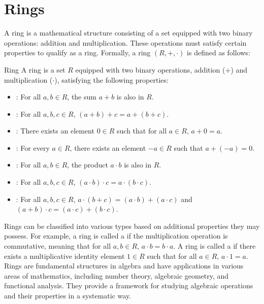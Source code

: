 \documentclass[openany]{book}
\begin{document}
\section{Rings}
A ring is a mathematical structure consisting of a set equipped with two binary operations: addition and multiplication. These operations must satisfy certain properties to qualify as a ring. Formally, a ring $(R, +, \cdot)$ is defined as follows:
\begin{mydefinition}{Ring}
A ring is a set $R$ equipped with two binary operations, addition ($+$) and multiplication ($\cdot$), satisfying the following properties:
\begin{itemize}
    \item {}: For all $a, b \in R$, the sum $a + b$ is also in $R$.
    \item {}: For all $a, b, c \in R$, $(a + b) + c = a + (b + c)$.
    \item {}: There exists an element $0 \in R$ such that for all $a \in R$, $a + 0 = a$.
    \item {}: For every $a \in R$, there exists an element $-a \in R$ such that $a + (-a) = 0$.
    \item {}: For all $a, b \in R$, the product $a \cdot b$ is also in $R$.
    \item {}: For all $a, b, c \in R$, $(a \cdot b) \cdot c = a \cdot (b \cdot c)$.
    \item {}: For all $a, b, c \in R$, $a \cdot (b + c) = (a \cdot b) + (a \cdot c)$ and $(a + b) \cdot c = (a \cdot c) + (b \cdot c)$.
\end{itemize}
\end{mydefinition}
Rings can be classified into various types based on additional properties they may possess. For example, a ring is called a  if the multiplication operation is commutative, meaning that for all $a, b \in R$, $a \cdot b = b \cdot a$. A ring is called a  if there exists a multiplicative identity element $1 \in R$ such that for all $a \in R$, $a \cdot 1 = a$. \\
Rings are fundamental structures in algebra and have applications in various areas of mathematics, including number theory, algebraic geometry, and functional analysis. They provide a framework for studying algebraic operations and their properties in a systematic way. \cite{Artin}
\end{document}
